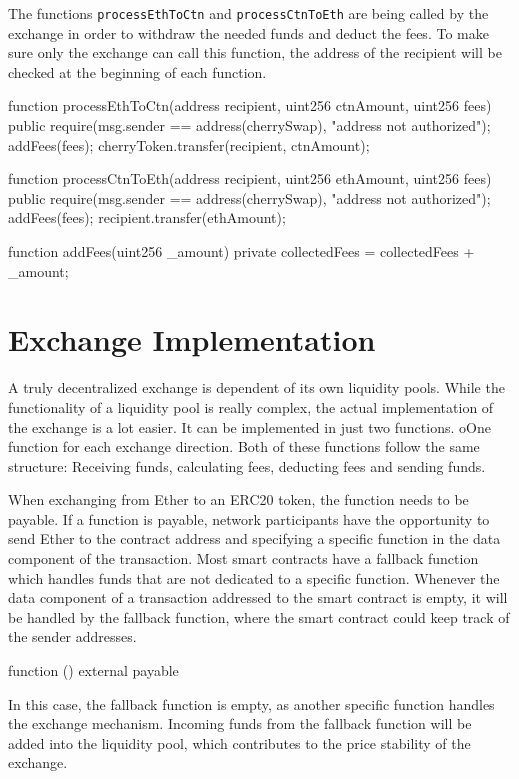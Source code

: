 The functions \texttt{processEthToCtn} and \texttt{processCtnToEth} are being called by the exchange in order to withdraw the needed funds and deduct the fees. To make sure only the exchange can call this function, the address of the recipient will be checked at the beginning of each function.
\begin{GenericCode}
function processEthToCtn(address recipient, uint256 ctnAmount, uint256 fees) public  {
  require(msg.sender == address(cherrySwap), "address not authorized");
  addFees(fees);
  cherryToken.transfer(recipient, ctnAmount);
}

function processCtnToEth(address recipient, uint256 ethAmount, uint256 fees) public {
  require(msg.sender == address(cherrySwap), "address not authorized");
  addFees(fees);
  recipient.transfer(ethAmount);
}

function addFees(uint256 _amount) private {
  collectedFees = collectedFees + _amount;
}	
\end{GenericCode}

\section{Exchange Implementation}
A truly decentralized exchange is dependent of its own liquidity pools. While the functionality of a liquidity pool is really complex, the actual implementation of the exchange is a lot easier. It can be implemented in just two functions. oOne function for each exchange direction. Both of these functions follow the same structure: Receiving funds, calculating fees, deducting fees and sending funds.

When exchanging from Ether to an ERC20 token, the function needs to be payable. If a function is payable, network participants have the opportunity to send Ether to the contract address and specifying a specific function in the data component of the transaction. Most smart contracts have a fallback function which handles funds that are not dedicated to a specific function. Whenever the data component of a transaction addressed to the smart contract is empty, it will be handled by the fallback function, where the smart contract could keep track of the sender addresses.
 
\begin{GenericCode}
function () external payable {} 
\end{GenericCode}

In this case, the fallback function is empty, as another specific function handles the exchange mechanism. Incoming funds from the fallback function will be added into the liquidity pool, which contributes to the price stability of the exchange.

